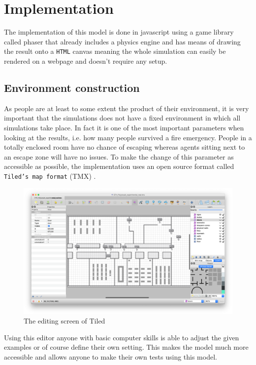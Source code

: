 \documentclass[11pt]{article}
\begin{document}
\section{Implementation}

The implementation of this model is done in javascript using a game library called phaser that already includes a physics engine and has means of drawing the result onto a \texttt{HTML} canvas meaning the whole simulation can easily be rendered on a webpage and doesn't require any setup.

\subsection{Environment construction}
As people are at least to some extent the product of their environment, it is very important that the simulations does not have a fixed environment in which all simulations take place. In fact it is one of the most important parameters when looking at the results, i.e. how many people survived a fire emergency. People in a totally enclosed room have no chance of escaping whereas agents sitting next to an escape zone will have no issues. To make the change of this parameter as accessible as possible, the implementation uses an open source format called \texttt{Tiled's map format} (TMX) \cite{Tiled} .

\begin{figure}[H]
	\centering
	\includegraphics[width=1\linewidth]{assets/tiled-editor}\\
	The editing screen of Tiled
\end{figure}

Using this editor anyone with basic computer skills is able to adjust the given examples or of course define their own setting. This makes the model much more accessible and allows anyone to make their own tests using this model.
\end{document}
